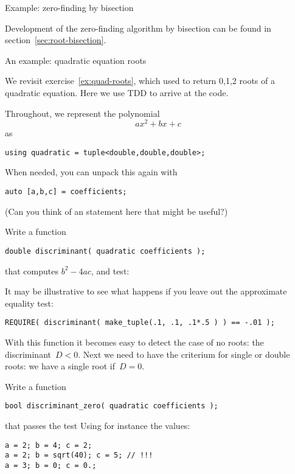 
 {Example: zero-finding by bisection}

Development of the zero-finding algorithm by bisection
can be found in section~\ref{sec:root-bisection}.

 {An example: quadratic equation roots}
\label{sec:quad-tdd}

We revisit exercise~\ref{ex:quad-roots},
which used 
to return 0,1,2 roots of a quadratic equation.
Here we use \ac{TDD} to arrive at the code.

Throughout, we represent the polynomial
\[ ax^2+bx+c \]
as 
\begin{lstlisting}
using quadratic = tuple<double,double,double>;  
\end{lstlisting}
When needed, you can unpack this again with
\begin{lstlisting}
auto [a,b,c] = coefficients;  
\end{lstlisting}
(Can you think of an  statement here
that might be useful?)

\begin{exercise}
  \label{ex:qdisc}
  Write a function
\begin{lstlisting}
double discriminant( quadratic coefficients );
\end{lstlisting}
that computes $b^2-4ac$, and test:
\end{exercise}

It may be illustrative to see what happens if you leave out the
approximate equality test:
\begin{lstlisting}
REQUIRE( discriminant( make_tuple(.1, .1, .1*.5 ) ) == -.01 );
\end{lstlisting}

With this function it becomes easy to detect the case of no roots:
the discriminant~$D<0$.
Next we need to have the criterium for single or double roots:
we have a single root if~$D=0$.

\begin{exercise}
  \label{ex:qdisczero}
  Write a function
\begin{lstlisting}
bool discriminant_zero( quadratic coefficients );
\end{lstlisting}
that passes the test
Using for instance the values:
\begin{lstlisting}
a = 2; b = 4; c = 2;
a = 2; b = sqrt(40); c = 5; // !!!
a = 3; b = 0; c = 0.;
\end{lstlisting}
\end{exercise}

